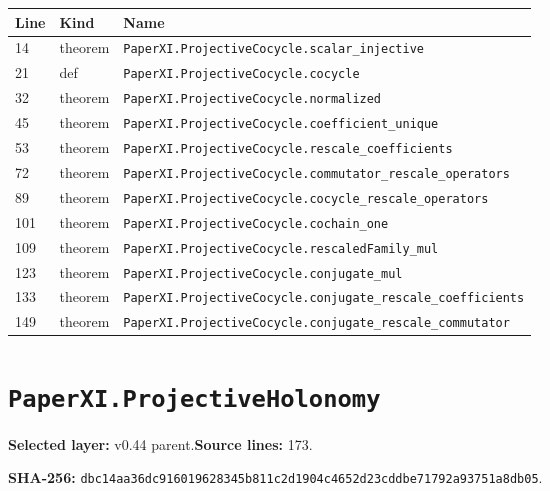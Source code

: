 \documentclass[10pt,oneside]{book}
\begin{document}
\begin{longtable}{@{}p{}p{}p{}@{}}\toprule Line&Kind&Name\\\midrule\endhead

14&theorem&\nolinkurl{PaperXI.ProjectiveCocycle.scalar_injective}\\

21&def&\nolinkurl{PaperXI.ProjectiveCocycle.cocycle}\\

32&theorem&\nolinkurl{PaperXI.ProjectiveCocycle.normalized}\\

45&theorem&\nolinkurl{PaperXI.ProjectiveCocycle.coefficient_unique}\\

53&theorem&\nolinkurl{PaperXI.ProjectiveCocycle.rescale_coefficients}\\

72&theorem&\nolinkurl{PaperXI.ProjectiveCocycle.commutator_rescale_operators}\\

89&theorem&\nolinkurl{PaperXI.ProjectiveCocycle.cocycle_rescale_operators}\\

101&theorem&\nolinkurl{PaperXI.ProjectiveCocycle.cochain_one}\\

109&theorem&\nolinkurl{PaperXI.ProjectiveCocycle.rescaledFamily_mul}\\

123&theorem&\nolinkurl{PaperXI.ProjectiveCocycle.conjugate_mul}\\

133&theorem&\nolinkurl{PaperXI.ProjectiveCocycle.conjugate_rescale_coefficients}\\

149&theorem&\nolinkurl{PaperXI.ProjectiveCocycle.conjugate_rescale_commutator}\\

\bottomrule\end{longtable}

\section{\texorpdfstring{\nolinkurl{PaperXI.ProjectiveHolonomy}}{PaperXI.ProjectiveHolonomy}}\label{module:PaperXI.ProjectiveHolonomy}

\textbf{Selected layer:} v0.44 parent.\quad\textbf{Source lines:} 173.\par\textbf{SHA-256:} {\scriptsize\nolinkurl{dbc14aa36dc916019628345b811c2d1904c4652d23cddbe71792a93751a8db05}}.
\end{document}
